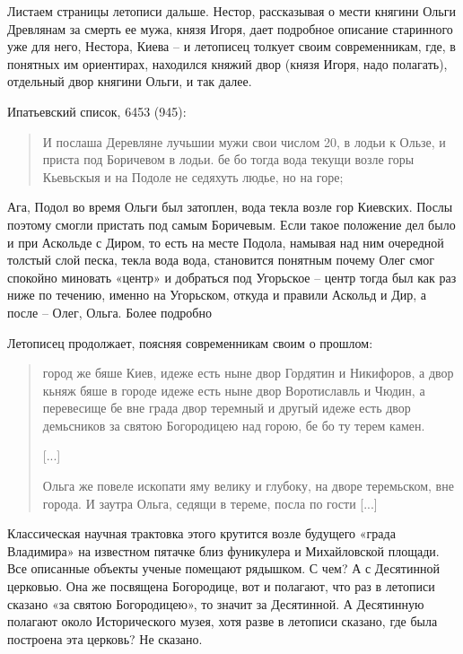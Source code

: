 \documentclass[a5paper,11pt,openany]{article}
\begin{document}
Листаем страницы летописи дальше. Нестор, рассказывая о мести княгини Ольги Древлянам за смерть ее мужа, князя Игоря, дает подробное описание старинного уже для него, Нестора, Киева – и летописец толкует своим  современникам, где, в понятных им ориентирах, находился княжий двор (князя Игоря, надо полагать), отдельный двор княгини Ольги, и так далее.

Ипатьевский список, 6453 (945):

\begin{quotation}
\noindent И послаша Деревляне лучьшии мужи свои числом 20, в лодьи к Ользе, и приста под Боричевом в лодьи. бе бо тогда вода текущи возле горы Кьевьскыя и на Подоле не седяхуть людье, но на горе;
\end{quotation}

Ага, Подол во время Ольги был затоплен, вода текла возле гор Киевских. Послы поэтому смогли пристать под самым Боричевым. Если такое положение дел было и при Аскольде с Диром, то есть на месте Подола, намывая над ним очередной толстый слой песка, текла вода вода, становится понятным почему Олег смог спокойно миновать «центр» и добраться под Угорьское – центр тогда был как раз ниже по течению, именно на Угорьском, откуда и правили Аскольд и Дир, а после – Олег, Ольга. Более подробно 

Летописец продолжает, поясняя современникам своим о прошлом:

\begin{quotation}
\noindent город же бяше Киев, идеже есть ныне двор Гордятин и Никифоров, а двор кьняж бяше в городе идеже есть ныне двор Воротиславль и Чюдин, а перевесище бе вне града двор теремный и другый идеже есть двор демьсников за святою Богородицею над горою, бе бо ту терем камен.

[...]

Ольга же повеле ископати яму велику и глубоку, на дворе теремьском, вне города. И заутра Ольга, седящи в тереме, посла по гости [...]
\end{quotation}

Классическая научная трактовка этого крутится возле будущего «града Владимира» на известном пятачке близ фуникулера и Михайловской площади. Все описанные объекты ученые помещают рядышком. С чем? А с Десятинной церковью. Она же посвящена Богородице, вот и полагают, что раз в летописи сказано «за святою Богородицею», то значит за Десятинной. А Десятинную полагают около Исторического музея, хотя разве в летописи сказано, где была построена эта церковь? Не сказано.
\end{document}
